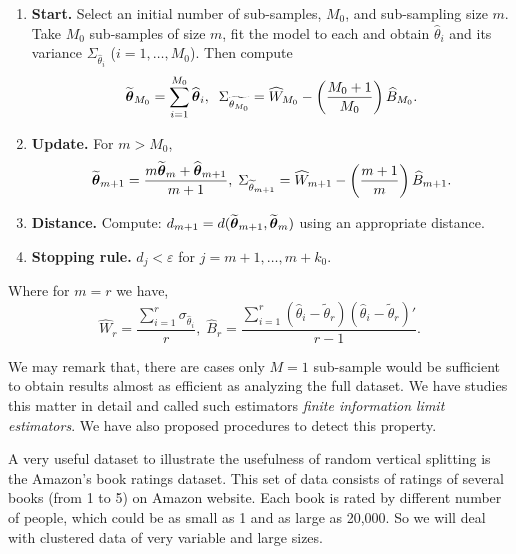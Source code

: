 \documentclass[11pt,a5paper,twoside]{book}
\newcommand{\bftheta}{\mbox{\boldmath $\theta$}}
\begin{document}
\begin{enumerate}
\item \textbf{Start.} Select an initial number of sub-samples, $M_0$, and sub-sampling size $m$. Take $M_0$ sub-samples of size $m$, fit the model to each and obtain $\widehat{\theta}_i$ and its variance $\Sigma_{\widehat{\theta}_i}$ ($i=1,\ldots,M_0$). Then compute 
\begin{equation}
\label{intro_comb_rules}
\widetilde{\bftheta}_{M_0} = \sum_{i=1}^{M_0} \widehat{\bftheta}_i,\;\; \Sigma_{\widetilde{\theta_{M_0}}}=\widehat{W}_{M_0} - \left( \frac{M_0+1}{M_0} \right) \widehat{B}_{M_0}.
\end{equation}

			\item \textbf{Update.} For $m>M_0$, \begin{equation}
	\label{introupdate}
	\widetilde{{\bftheta}}_{m+1}=\frac{m\widetilde{\bftheta}_m + \widehat{\bftheta}_{m+1}}{m+1},\; \Sigma_{\widetilde{\theta}_{m+1}}=\widehat{W}_{m+1} - \left( \frac{m+1}{m} \right) \widehat{B}_{m+1}.
	\end{equation}
	\item \textbf{Distance.} Compute: $d_{m+1}=d(\widetilde{\bftheta}_{m+1},\widetilde{\bftheta}_{m})$ using an appropriate distance.
	\item \textbf{Stopping rule.} $d_{j} < \varepsilon$ for $j=m+1,\ldots,m+k_0$.
\end{enumerate}
Where for $m=r$ we have,
\begin{equation}
\widehat{W}_r= \frac{\sum_{i=1}^r \sigma_{\widehat{\theta}_i}}{r},\; \widehat{B}_r= \frac{\sum_{i=1}^r (\widehat{\theta}_i - \widetilde{\theta}_r)(\widehat{\theta}_i - \widetilde{\theta}_r)'}{r-1}.
\end{equation}

We may remark that, there are cases only $M=1$ sub-sample would be sufficient to obtain results almost as efficient as analyzing the full dataset. We have studies this matter in detail and called such estimators \textit{finite information limit estimators}. We have also proposed procedures to detect this property.

A very useful dataset to illustrate the usefulness of random vertical splitting is the Amazon's book ratings dataset. This set of data consists of ratings of several books (from 1 to 5) on Amazon website. Each book is rated by different number of people, which could be as small as 1 and as large as 20,000. So we will deal with clustered data of very variable and large sizes. 
\end{document}
